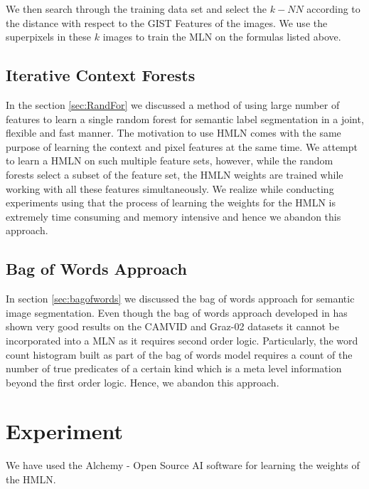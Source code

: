 \documentclass{article} %
\begin{document}
We then search through the training data set and select the $k-NN$ according to the distance with respect to the GIST Features \cite{Gist} of the images. We use the superpixels in these $k$ images to train the MLN on the formulas listed above.

\subsection{Iterative Context Forests}
\label{sec:IterContFor}

In the section \ref{sec:RandFor} we discussed a method of using large number of features to learn a single random forest for semantic label segmentation in a joint, flexible and fast manner. The motivation to use HMLN comes with the same purpose of learning the context and pixel features at the same time. We attempt to learn a HMLN on such multiple feature sets, however, while the random forests select a subset of the feature set, the HMLN weights are trained while working with all these features simultaneously. We realize while conducting experiments using \cite{alchemy} that the process of learning the weights for the HMLN is extremely time consuming and memory intensive and hence we abandon this approach. 

\subsection{Bag of Words Approach}
\label{sec:BofWordApp}

In section \ref{sec:bagofwords} we discussed the bag of words approach for semantic image segmentation. Even though the bag of words approach developed in \cite{visualdictrene} has shown very good results on the CAMVID and Graz-02 \cite{graz02} datasets it cannot be incorporated into a MLN as it requires second order logic. Particularly, the word count histogram built as part of the bag of words model requires a count of the number of true predicates of a certain kind which is a meta level information beyond the first order logic. Hence, we abandon this approach.

\section{Experiment}
\label{sec:Exp}

We have used the Alchemy - Open Source AI software \cite{alchemy} for learning the weights of the HMLN.
\end{document}
